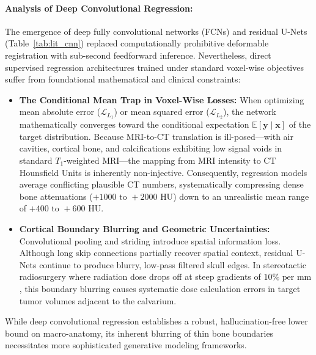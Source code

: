 \paragraph{Analysis of Deep Convolutional Regression:}
The emergence of deep fully convolutional networks (FCNs) and residual U-Nets (Table~\ref{tab:lit_cnn}) replaced computationally prohibitive deformable registration with sub-second feedforward inference. Nevertheless, direct supervised regression architectures trained under standard voxel-wise objectives suffer from foundational mathematical and clinical constraints:
\begin{itemize}
    \item \textbf{The Conditional Mean Trap in Voxel-Wise Losses:} When optimizing mean absolute error ($\mathcal{L}_{L_1}$) or mean squared error ($\mathcal{L}_{L_2}$), the network mathematically converges toward the conditional expectation $\mathbb{E}[\mathbf{y} \mid \mathbf{x}]$ of the target distribution. Because MRI-to-CT translation is ill-posed---with air cavities, cortical bone, and calcifications exhibiting low signal voids in standard $T_1$-weighted MRI---the mapping from MRI intensity to CT Hounsfield Units is inherently non-injective. Consequently, regression models average conflicting plausible CT numbers, systematically compressing dense bone attenuations ($+1000\text{ to }+2000\text{ HU}$) down to an unrealistic mean range of $+400\text{ to }+600\text{ HU}$.
    \item \textbf{Cortical Boundary Blurring and Geometric Uncertainties:} Convolutional pooling and striding introduce spatial information loss. Although long skip connections partially recover spatial context, residual U-Nets continue to produce blurry, low-pass filtered skull edges. In stereotactic radiosurgery where radiation dose drops off at steep gradients of $10\%\text{ per mm}$, this boundary blurring causes systematic dose calculation errors in target tumor volumes adjacent to the calvarium.
\end{itemize}
While deep convolutional regression establishes a robust, hallucination-free lower bound on macro-anatomy, its inherent blurring of thin bone boundaries necessitates more sophisticated generative modeling frameworks.

\vspace{10pt}
